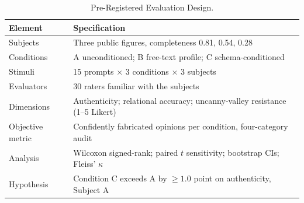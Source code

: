\begin{table}[htbp]
\caption{Pre-Registered Evaluation Design.}
\label{tab:eval_design}
\centering
\begin{tabular}{lp{5.8cm}}
\toprule
\textbf{Element} & \textbf{Specification} \\
\midrule
Subjects          & Three public figures, completeness 0.81, 0.54, 0.28 \\
Conditions        & A unconditioned; B free-text profile; C schema-conditioned \\
Stimuli           & 15 prompts $\times$ 3 conditions $\times$ 3 subjects \\
Evaluators        & 30 raters familiar with the subjects \\
Dimensions        & Authenticity; relational accuracy; uncanny-valley resistance (1--5 Likert) \\
Objective metric  & Confidently fabricated opinions per condition, four-category audit \\
Analysis          & Wilcoxon signed-rank; paired $t$ sensitivity; bootstrap CIs; Fleiss' $\kappa$ \\
Hypothesis        & Condition C exceeds A by $\ge 1.0$ point on authenticity, Subject A \\
\bottomrule
\end{tabular}
\end{table}
